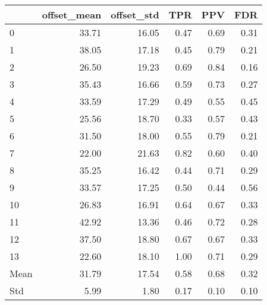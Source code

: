 \begin{tabular}{lrrrrr}
\toprule
{} &  offset\_mean &  offset\_std &   TPR &   PPV &   FDR \\
\midrule
0    &        33.71 &       16.05 &  0.47 &  0.69 &  0.31 \\
1    &        38.05 &       17.18 &  0.45 &  0.79 &  0.21 \\
2    &        26.50 &       19.23 &  0.69 &  0.84 &  0.16 \\
3    &        35.43 &       16.66 &  0.59 &  0.73 &  0.27 \\
4    &        33.59 &       17.29 &  0.49 &  0.55 &  0.45 \\
5    &        25.56 &       18.70 &  0.33 &  0.57 &  0.43 \\
6    &        31.50 &       18.00 &  0.55 &  0.79 &  0.21 \\
7    &        22.00 &       21.63 &  0.82 &  0.60 &  0.40 \\
8    &        35.25 &       16.42 &  0.44 &  0.71 &  0.29 \\
9    &        33.57 &       17.25 &  0.50 &  0.44 &  0.56 \\
10   &        26.83 &       16.91 &  0.64 &  0.67 &  0.33 \\
11   &        42.92 &       13.36 &  0.46 &  0.72 &  0.28 \\
12   &        37.50 &       18.80 &  0.67 &  0.67 &  0.33 \\
13   &        22.60 &       18.10 &  1.00 &  0.71 &  0.29 \\
Mean &        31.79 &       17.54 &  0.58 &  0.68 &  0.32 \\
Std  &         5.99 &        1.80 &  0.17 &  0.10 &  0.10 \\
\bottomrule
\end{tabular}
